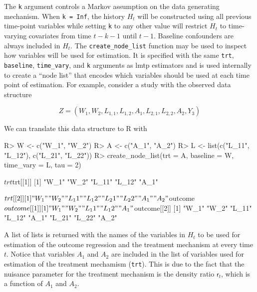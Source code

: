\documentclass[twoside,11pt]{article}
\newenvironment{CodeChunk}{}{}
\renewcommand{\r}{\mathsf{r}}
\let\proglang=\textsf
\newcommand{\pkg}[1]{{\fontseries{b}\selectfont #1}}
\let\code=\texttt
\begin{document}
The \code{k} argument controls a Markov assumption on the data generating mechanism. When \code{k = Inf}, the history $H_t$ will be constructed using all previous time-point variables while setting \code{k} to any other value will restrict $H_t$ to time-varying covariates from time $t - k - 1$ until $t-1$. Baseline confounders are always included in $H_t$. The
\code{create\_node\_list} function may be used to inspect how variables will be used for estimation. It is specified with the same \code{trt}, \code{baseline}, \code{time\_vary}, and \code{k} arguments as \pkg{lmtp} estimators and is used internally to create a ``node list'' that encodes which variables should be used at each time point of estimation. For example, consider a study with the observed data structure

\begin{equation}
Z = (W_1, W_2, L_{1, 1}, L_{1, 2}, A_1, L_{2, 1}, L_{2, 2}, A_2, Y_3)
\end{equation}

We can translate this data structure to \proglang{R} with

\begin{CodeChunk}

\begin{CodeInput}
R> W <- c("W_1", "W_2")
R> A <- c("A_1", "A_2")
R> L <- list(c("L_11", "L_12"), c("L_21", "L_22"))
R> create_node_list(trt = A, baseline = W, time_vary = L, tau = 2)
\end{CodeInput}

\begin{CodeOutput}
$trt
$trt[[1]]
[1] "W_1"  "W_2"  "L_11" "L_12" "A_1" 

$trt[[2]]
[1] "W_1"  "W_2"  "L_11" "L_12" "L_21" "L_22" "A_1"  "A_2" 


$outcome
$outcome[[1]]
[1] "W_1"  "W_2"  "L_11" "L_12" "A_1" 

$outcome[[2]]
[1] "W_1"  "W_2"  "L_11" "L_12" "A_1"  "L_21" "L_22" "A_2" 
\end{CodeOutput}
\end{CodeChunk}

A list of lists is returned with the names of the variables in $H_t$ to be used for estimation of the outcome regression and the treatment mechanism at every time $t$.  Notice that variables $A_1$ and $A_2$ are included in the list of variables used for estimation of the treatment mechamism (\code{trt}). This is due to the fact that the nuisance parameter for the treatment mechanism is the density ratio $\r_t$, which is a function of $A_1$ and $A_2$.
\end{document}
